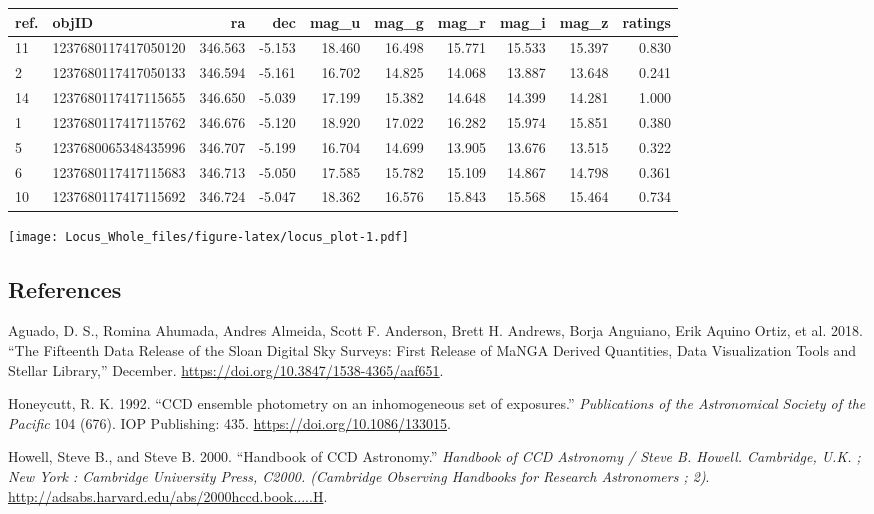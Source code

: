 \documentclass[]{elsarticle} %
\makeatletter
\def\maxwidth{\ifdim\Gin@nat@width>\linewidth\linewidth
\else\Gin@nat@width\fi}
\let\Oldincludegraphics\includegraphics
\renewcommand{\includegraphics}[1]{\Oldincludegraphics[width=\maxwidth]{#1}}
\makeatother
\begin{document}
\begin{tabular}{l|l|r|r|r|r|r|r|r|r}
\hline
ref. & objID & ra & dec & mag\_u & mag\_g & mag\_r & mag\_i & mag\_z & ratings\\
\hline
11 & 1237680117417050120 & 346.563 & -5.153 & 18.460 & 16.498 & 15.771 & 15.533 & 15.397 & 0.830\\
\hline
2 & 1237680117417050133 & 346.594 & -5.161 & 16.702 & 14.825 & 14.068 & 13.887 & 13.648 & 0.241\\
\hline
14 & 1237680117417115655 & 346.650 & -5.039 & 17.199 & 15.382 & 14.648 & 14.399 & 14.281 & 1.000\\
\hline
1 & 1237680117417115762 & 346.676 & -5.120 & 18.920 & 17.022 & 16.282 & 15.974 & 15.851 & 0.380\\
\hline
5 & 1237680065348435996 & 346.707 & -5.199 & 16.704 & 14.699 & 13.905 & 13.676 & 13.515 & 0.322\\
\hline
6 & 1237680117417115683 & 346.713 & -5.050 & 17.585 & 15.782 & 15.109 & 14.867 & 14.798 & 0.361\\
\hline
10 & 1237680117417115692 & 346.724 & -5.047 & 18.362 & 16.576 & 15.843 & 15.568 & 15.464 & 0.734\\
\hline
\end{tabular}

\texttt{[image: Locus\_Whole\_files/figure-latex/locus\_plot-1.pdf]}

\newpage

\hypertarget{references}{%
\subsection*{References}\label{references}}

\hypertarget{refs}{}
\leavevmode\hypertarget{ref-Aguado2018}{}%
Aguado, D. S., Romina Ahumada, Andres Almeida, Scott F. Anderson, Brett
H. Andrews, Borja Anguiano, Erik Aquino Ortiz, et al. 2018. ``The
Fifteenth Data Release of the Sloan Digital Sky Surveys: First Release
of MaNGA Derived Quantities, Data Visualization Tools and Stellar
Library,'' December. \url{https://doi.org/10.3847/1538-4365/aaf651}.

\leavevmode\hypertarget{ref-Honeycutt1992}{}%
Honeycutt, R. K. 1992. ``CCD ensemble photometry on an inhomogeneous set
of exposures.'' \emph{Publications of the Astronomical Society of the
Pacific} 104 (676). IOP Publishing: 435.
\url{https://doi.org/10.1086/133015}.

\leavevmode\hypertarget{ref-Howell2000}{}%
Howell, Steve B., and Steve B. 2000. ``Handbook of CCD Astronomy.''
\emph{Handbook of CCD Astronomy / Steve B. Howell. Cambridge, U.K. ; New
York : Cambridge University Press, C2000. (Cambridge Observing Handbooks
for Research Astronomers ; 2)}.
\url{http://adsabs.harvard.edu/abs/2000hccd.book.....H}.
\end{document}
